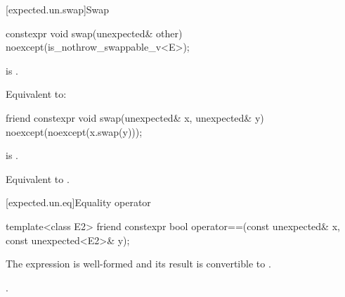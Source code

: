 [expected.un.swap]{Swap}

%
\begin{itemdecl}
constexpr void swap(unexpected& other) noexcept(is_nothrow_swappable_v<E>);
\end{itemdecl}

\begin{itemdescr}
\pnum
\mandates
{} is .

\pnum
\effects
Equivalent to:
\end{itemdescr}

\begin{itemdecl}
friend constexpr void swap(unexpected& x, unexpected& y) noexcept(noexcept(x.swap(y)));
\end{itemdecl}

\begin{itemdescr}
\pnum
\constraints
{} is .

\pnum
\effects
Equivalent to .
\end{itemdescr}

[expected.un.eq]{Equality operator}

%
\begin{itemdecl}
template<class E2>
  friend constexpr bool operator==(const unexpected& x, const unexpected<E2>& y);
\end{itemdecl}

\begin{itemdescr}
\pnum
\mandates
The expression  is well-formed and
its result is convertible to .

\pnum
\returns
{}.
\end{itemdescr}

